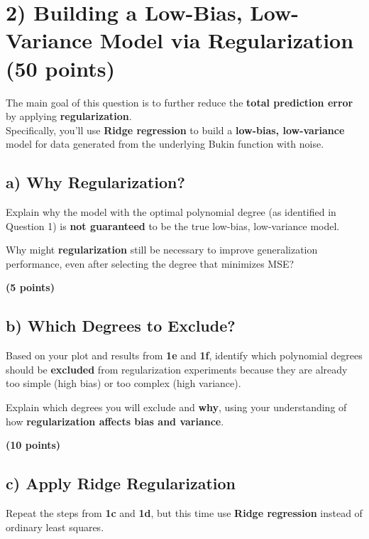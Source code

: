 \documentclass[
  letterpaper,
  DIV=11,
  numbers=noendperiod]{scrreprt}
\begin{document}
\section{2) Building a Low-Bias, Low-Variance Model via Regularization
(50
points)}\label{building-a-low-bias-low-variance-model-via-regularization-50-points}

The main goal of this question is to further reduce the \textbf{total
prediction error} by applying \textbf{regularization}.\\
Specifically, you'll use \textbf{Ridge regression} to build a
\textbf{low-bias, low-variance} model for data generated from the
underlying Bukin function with noise.

\subsection{a) Why Regularization?}\label{a-why-regularization}

Explain why the model with the optimal polynomial degree (as identified
in Question 1) is \textbf{not guaranteed} to be the true low-bias,
low-variance model.

Why might \textbf{regularization} still be necessary to improve
generalization performance, even after selecting the degree that
minimizes MSE?

\textbf{(5 points)}

\subsection{b) Which Degrees to
Exclude?}\label{b-which-degrees-to-exclude}

Based on your plot and results from \textbf{1e} and \textbf{1f},
identify which polynomial degrees should be \textbf{excluded} from
regularization experiments because they are already too simple (high
bias) or too complex (high variance).

Explain which degrees you will exclude and \textbf{why}, using your
understanding of how \textbf{regularization affects bias and variance}.

\textbf{(10 points)}

\subsection{c) Apply Ridge
Regularization}\label{c-apply-ridge-regularization}

Repeat the steps from \textbf{1c} and \textbf{1d}, but this time use
\textbf{Ridge regression} instead of ordinary least squares.
\end{document}
